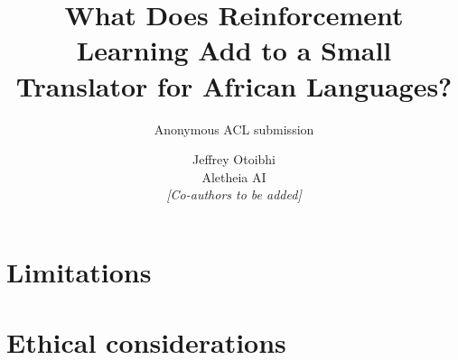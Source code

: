 \documentclass[11pt]{article}
\title{What Does Reinforcement Learning Add to a Small Translator for African Languages?}
\author{Anonymous ACL submission}
\author{Jeffrey Otoibhi \\ Aletheia AI \\ \textit{[Co-authors to be added]}}
\newif\ifanon \anontrue
\begin{document}
\maketitle
\begin{abstract}

\end{abstract}






\FloatBarrier\label{coreend}
\clearpage
\section*{Limitations}

\section*{Ethical considerations}

\ifanon\else
\section*{Author contributions}
\textit{[Placeholder, to be filled by the lead author: one sentence per person describing what that person contributed (for example design, data, training, evaluation, writing). Authorship is based on contribution.]}
\fi



\clearpage
\appendix
\label{appstart}
\onecolumn

\end{document}
